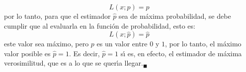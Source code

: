 \begin{solucion}
 \begin{equation*}
  L(x;p) = p
 \end{equation*}
 por lo tanto, para que el estimador $\hat{p}$ sea de m\'axima probabilidad, se debe cumplir que al evaluarla en la funci\'on de probabilidad, esto es: 
 \begin{equation*}
  L\left(x; \hat{p} \right) = \hat{p}
 \end{equation*}
 este valor sea m\'aximo, pero $p$ es un valor entre $0$ y $1$, por lo tanto, el m\'aximo valor posible es $\hat{p} = 1$. Es decir, $\hat{p} = 1$ s\'{\i} es, en efecto, el estimador de m\'axima verosimilitud, que es a lo que se quer\'{\i}a llegar.${}_{\blacksquare}$
\end{solucion}
